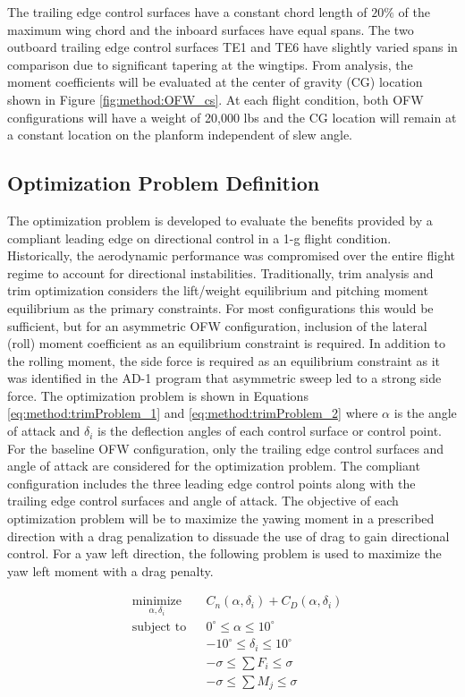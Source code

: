 The trailing edge control surfaces have a constant chord length of $20\%$ of the maximum wing chord and the inboard surfaces have equal spans.
The two outboard trailing edge control surfaces TE1 and TE6 have slightly varied spans in comparison due to significant tapering at the wingtips.
From analysis, the moment coefficients will be evaluated at the center of gravity (CG) location shown in Figure \ref{fig:method:OFW_cs}.
At each flight condition, both OFW configurations will have a weight of 20,000 lbs and the CG location will remain at a constant location on the planform independent of slew angle.

\subsection{Optimization Problem Definition}

The optimization problem is developed to evaluate the benefits provided by a compliant leading edge on directional control in a 1-g flight condition.
Historically, the aerodynamic performance was compromised over the entire flight regime to account for directional instabilities.
Traditionally, trim analysis and trim optimization considers the lift/weight equilibrium and pitching moment equilibrium as the primary constraints.
For most configurations this would be sufficient, but for an asymmetric OFW configuration, inclusion of the lateral (roll) moment coefficient as an equilibrium constraint is required.
In addition to the rolling moment, the side force is required as an equilibrium constraint as it was identified in the AD-1 program that asymmetric sweep led to a strong side force.
The optimization problem is shown in Equations \eqref{eq:method:trimProblem_1} and \eqref{eq:method:trimProblem_2} where $\alpha$ is the angle of attack and $\delta_i$ is the deflection angles of each control surface or control point.
For the baseline OFW configuration, only the trailing edge control surfaces and angle of attack are considered for the optimization problem.
The compliant configuration includes the three leading edge control points along with the trailing edge control surfaces and angle of attack.
The objective of each optimization problem will be to maximize the yawing moment in a prescribed direction with a drag penalization to dissuade the use of drag to gain directional control.
For a yaw left direction, the following problem is used to maximize the yaw left moment with a drag penalty.

\begin{equation}
  \begin{aligned}
  & \underset{\alpha, \delta_i}{\text{minimize}}
  & &  C_n  \left(\alpha, \delta_i \right) + C_D \left(\alpha, \delta_i \right) \\
  & \text{subject to}
    & &   0^\circ \leq \alpha \leq 10^\circ \\
  & & & -10^\circ \leq \delta_i \leq 10^\circ \\
  & & & -\sigma \leq \sum F_i  \leq \sigma \\
  & & & -\sigma \leq \sum M_j  \leq \sigma \\
  \end{aligned}
  \label{eq:method:trimProblem_1}
\end{equation}

